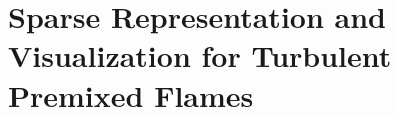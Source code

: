 \chapter[Sparse Representation for Turbulent Premixed Flames]
        {Sparse Representation and Visualization for Turbulent Premixed Flames} %
\label{cha:sparse_representation}
%
%

%

%

%

%

%

%

%
